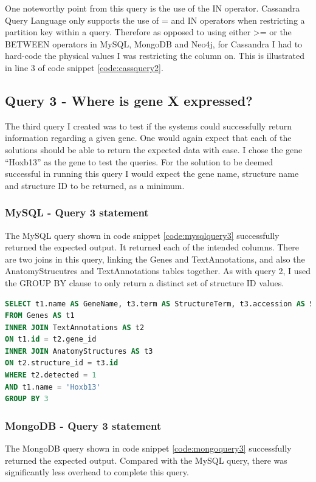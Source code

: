 One noteworthy point from this query is the use of the IN operator. Cassandra Query Language only supports the use of = and IN operators when restricting a partition key within a query. Therefore as opposed to using either >= or the BETWEEN operators in MySQL, MongoDB and Neo4j, for Cassandra I had to hard-code the physical values I was restricting the column on. This is illustrated in line 3 of code snippet \ref{code:cassquery2}.

\subsection*{Query 3 - Where is gene X expressed?}\label{query3}
The third query I created was to test if the systems could successfully return information regarding a given gene. One would again expect that each of the solutions should be able to return the expected data with ease. I chose the gene ``Hoxb13'' as the gene to test the queries. For the solution to be deemed successful in running this query I would expect the gene name, structure name and structure ID to be returned, as a minimum.

\subsubsection*{MySQL - Query 3 statement}\label{mysqlquery3statement}
The MySQL query shown in code snippet \ref{code:mysqlquery3} successfully returned the expected output. It returned each of the intended columns. There are two joins in this query, linking the Genes and TextAnnotations, and also the AnatomyStrucutres and TextAnnotations tables together. As with query 2, I used the GROUP BY clause to only return a distinct set of structure ID values.

\begin{lstlisting}[language=SQL, caption=MySQL query 3 statement. Where is gene X expressed?., label=code:mysqlquery3]
SELECT t1.name AS GeneName, t3.term AS StructureTerm, t3.accession AS StructureID
FROM Genes AS t1
INNER JOIN TextAnnotations AS t2
ON t1.id = t2.gene_id
INNER JOIN AnatomyStructures AS t3
ON t2.structure_id = t3.id
WHERE t2.detected = 1
AND t1.name = 'Hoxb13'
GROUP BY 3
\end{lstlisting}

\subsubsection*{MongoDB - Query 3 statement}\label{mongoquery3statement}
The MongoDB query shown in code snippet \ref{code:mongoquery3} successfully returned the expected output. Compared with the MySQL query, there was significantly less overhead to complete this query.

